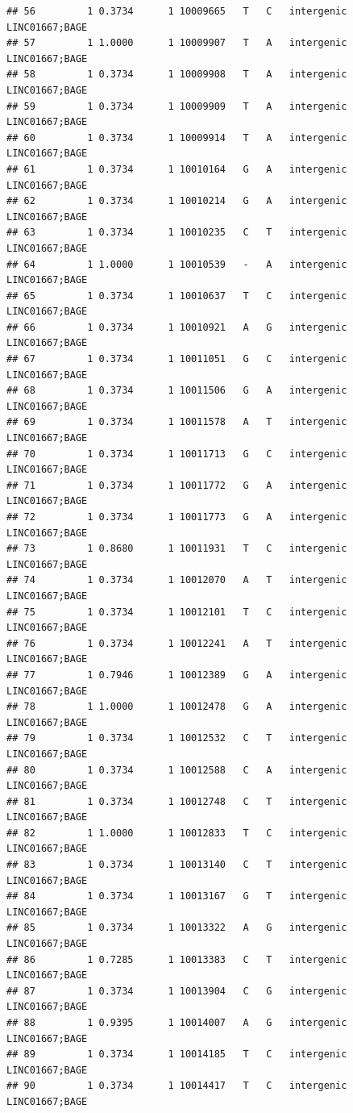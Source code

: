\documentclass[
]{article}
\begin{document}
\begin{verbatim}
## 56         1 0.3734      1 10009665   T   C   intergenic LINC01667;BAGE
## 57         1 1.0000      1 10009907   T   A   intergenic LINC01667;BAGE
## 58         1 0.3734      1 10009908   T   A   intergenic LINC01667;BAGE
## 59         1 0.3734      1 10009909   T   A   intergenic LINC01667;BAGE
## 60         1 0.3734      1 10009914   T   A   intergenic LINC01667;BAGE
## 61         1 0.3734      1 10010164   G   A   intergenic LINC01667;BAGE
## 62         1 0.3734      1 10010214   G   A   intergenic LINC01667;BAGE
## 63         1 0.3734      1 10010235   C   T   intergenic LINC01667;BAGE
## 64         1 1.0000      1 10010539   -   A   intergenic LINC01667;BAGE
## 65         1 0.3734      1 10010637   T   C   intergenic LINC01667;BAGE
## 66         1 0.3734      1 10010921   A   G   intergenic LINC01667;BAGE
## 67         1 0.3734      1 10011051   G   C   intergenic LINC01667;BAGE
## 68         1 0.3734      1 10011506   G   A   intergenic LINC01667;BAGE
## 69         1 0.3734      1 10011578   A   T   intergenic LINC01667;BAGE
## 70         1 0.3734      1 10011713   G   C   intergenic LINC01667;BAGE
## 71         1 0.3734      1 10011772   G   A   intergenic LINC01667;BAGE
## 72         1 0.3734      1 10011773   G   A   intergenic LINC01667;BAGE
## 73         1 0.8680      1 10011931   T   C   intergenic LINC01667;BAGE
## 74         1 0.3734      1 10012070   A   T   intergenic LINC01667;BAGE
## 75         1 0.3734      1 10012101   T   C   intergenic LINC01667;BAGE
## 76         1 0.3734      1 10012241   A   T   intergenic LINC01667;BAGE
## 77         1 0.7946      1 10012389   G   A   intergenic LINC01667;BAGE
## 78         1 1.0000      1 10012478   G   A   intergenic LINC01667;BAGE
## 79         1 0.3734      1 10012532   C   T   intergenic LINC01667;BAGE
## 80         1 0.3734      1 10012588   C   A   intergenic LINC01667;BAGE
## 81         1 0.3734      1 10012748   C   T   intergenic LINC01667;BAGE
## 82         1 1.0000      1 10012833   T   C   intergenic LINC01667;BAGE
## 83         1 0.3734      1 10013140   C   T   intergenic LINC01667;BAGE
## 84         1 0.3734      1 10013167   G   T   intergenic LINC01667;BAGE
## 85         1 0.3734      1 10013322   A   G   intergenic LINC01667;BAGE
## 86         1 0.7285      1 10013383   C   T   intergenic LINC01667;BAGE
## 87         1 0.3734      1 10013904   C   G   intergenic LINC01667;BAGE
## 88         1 0.9395      1 10014007   A   G   intergenic LINC01667;BAGE
## 89         1 0.3734      1 10014185   T   C   intergenic LINC01667;BAGE
## 90         1 0.3734      1 10014417   T   C   intergenic LINC01667;BAGE

\end{verbatim}
\end{document}

